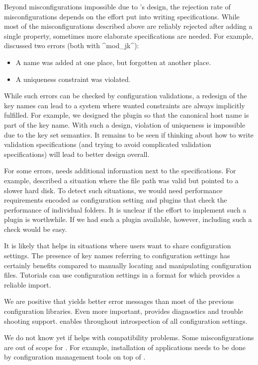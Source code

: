 \begin{code}[language=Cpp,firstnumber=19]
Beyond misconfigurations impossible due to \elektra{}'s design, the rejection rate of misconfigurations depends on the effort put into writing  specifications.
While most of the misconfigurations described above are reliably rejected after adding a single property, sometimes more elaborate specifications are needed.
For example, \citet{nagaraja2004understanding} discussed two errors (both with ^mod_jk^):
\begin{itemize}
\item A name was added at one place, but forgotten at another place.
\item A uniqueness constraint was violated.
\end{itemize}
While such errors can be checked by configuration validations, a redesign of the key names can lead to a system where wanted constraints are always implicitly fulfilled.
For example, we designed the plugin  so that the canonical host name is part of the key name.
With such a design, violation of uniqueness is impossible due to the key set semantics.
It remains to be seen if thinking about how to write validation specifications (and trying to avoid complicated validation specifications) will lead to better design overall.

For some errors, \elektra{} needs additional information next to the specifications.
For example, \citet{nagaraja2004understanding} described a situation where the file path was valid but pointed to a slower hard disk.
To detect such situations, we would need performance requirements encoded as configuration setting and plugins that check the performance of individual folders.
It is unclear if the effort to implement such a plugin is worthwhile.
If we had such a plugin available, however, including such a check would be easy.

It is likely that \elektra{} helps in situations where users want to share configuration settings.
The presence of key names referring to configuration settings has certainly benefits compared to manually locating and manipulating configuration files.
Tutorials can use configuration settings in a format for which \elektra{} provides a reliable import.

We are positive that \elektra{} yields better error messages than most of the previous configuration libraries.
Even more important, \elektra{} provides diagnostics and trouble shooting support.
\elektra{} enables throughout introspection of all configuration settings.

We do not know yet if \elektra{} helps with compatibility problems.
Some misconfigurations are out of scope for \elektra{}.
For example, installation of applications needs to be done by configuration management tools on top of \elektra{}.


\end{code}
